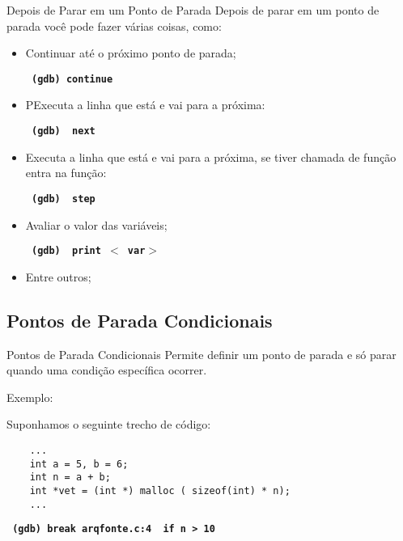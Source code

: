 \begin{frame}{Depois de Parar em um Ponto de Parada}
    Depois de parar em um ponto de parada você pode fazer várias coisas, como:
    \begin{itemize}
        \item Continuar até o próximo ponto de parada;
        \begin{center}
            \small
            \texttt{ \textbf{ (gdb) {\color{blue}continue} } }
        \end{center}
        \item PExecuta a linha que está e vai para a próxima:
        \begin{center}
            \small
            \texttt{ \textbf{ (gdb) {\color{blue} next} } }
        \end{center}
        \item Executa a linha que está e vai para a próxima, se tiver chamada de função entra na função:
        \begin{center}
            \small
            \texttt{ \textbf{ (gdb) {\color{blue} step} } }
        \end{center}
        \item Avaliar o valor das variáveis;
        \begin{center}
            \small
            \texttt{ \textbf{ (gdb) {\color{blue} print} $<${\color{red} var}$>$ } }
        \end{center}
        \item Entre outros;
    \end{itemize}
    
\end{frame}

\subsection{ Pontos de Parada Condicionais }
\frame{\tableofcontents[
    currentsection,
    currentsubsection,
    subsectionstyle=show/shaded/hide
]}
\begin{frame}[fragile]{Pontos de Parada Condicionais}
    Permite definir um ponto de parada e só parar quando uma condição específica ocorrer.
    
    Exemplo:
    
    Suponhamos o seguinte trecho de código:
    
    \begin{lstlisting}
    ...
    int a = 5, b = 6;
    int n = a + b;
    int *vet = (int *) malloc ( sizeof(int) * n);
    ...
    \end{lstlisting}
    
    \begin{center}
        \small
        \texttt{ \textbf{ (gdb) {\color{blue}break}  {\color{black}arqfonte}{\color{red}.c}:{\color{dartmouthgreen}4} {\color{red} if n > 10 }}}
    \end{center}
\end{frame}


